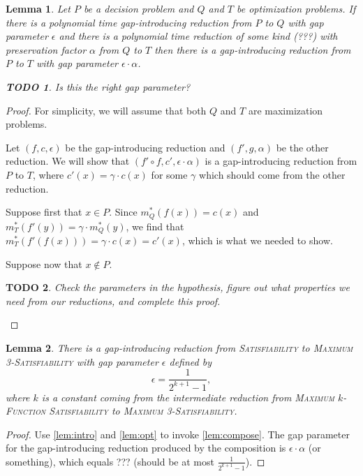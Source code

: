 \documentclass[]{article}
\theoremstyle{plain}
\newtheorem{lemma}{Lemma}
\newtheorem{todo}{TODO}
\theoremstyle{definition}
\begin{document}
\begin{lemma}\label{lem:compose}
  Let $P$ be a decision problem and $Q$ and $T$ be optimization problems.
  If there is a polynomial time gap-introducing reduction from $P$ to $Q$ with gap parameter $\epsilon$ and there is a polynomial time reduction of some kind (???) with preservation factor $\alpha$ from $Q$ to $T$ then there is a gap-introducing reduction from $P$ to $T$ with gap parameter $\epsilon \cdot \alpha$.
  \begin{todo}
    Is this the right gap parameter?
  \end{todo}
\end{lemma}
\begin{proof}
  For simplicity, we will assume that both $Q$ and $T$ are maximization problems.

  Let $(f, c, \epsilon)$ be the gap-introducing reduction and $(f', g, \alpha)$ be the other reduction.
  We will show that $(f' \circ f, c', \epsilon \cdot \alpha)$ is a gap-introducing reduction from $P$ to $T$, where $c'(x) = \gamma \cdot c(x)$ for some $\gamma$ which should come from the other reduction.

  Suppose first that $x \in P$.
  Since $m^*_Q(f(x)) = c(x)$ and $m^*_T(f'(y)) = \gamma \cdot m^*_Q(y)$, we find that $m^*_T(f'(f(x))) = \gamma \cdot c(x) = c'(x)$, which is what we needed to show.

  Suppose now that $x \notin P$.

  \begin{todo}
    Check the parameters in the hypothesis, figure out what properties we need from our reductions, and complete this proof.
  \end{todo}
\end{proof}

\begin{lemma}\label{lem:gap3}
  There is a gap-introducing reduction from \textsc{Satisfiability} to \textsc{Maximum 3-Satisfiability} with gap parameter $\epsilon$ defined by
  \begin{displaymath}
    \epsilon = \frac{1}{2^{k + 1} - 1},
  \end{displaymath}
  where $k$ is a constant coming from the intermediate reduction from \textsc{Maximum $k$-Function Satisfiability} to \textsc{Maximum 3-Satisfiability}.
\end{lemma}
\begin{proof}
  Use \autoref{lem:intro} and \autoref{lem:opt} to invoke \autoref{lem:compose}.
  The gap parameter for the gap-introducing reduction produced by the composition is $\epsilon \cdot \alpha$ (or something), which equals ??? (should be at most $\frac{1}{2^{k + 1} - 1}$).
\end{proof}
\end{document}
